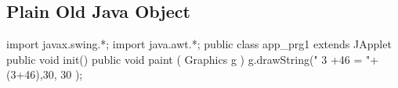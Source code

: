 \subsection{Plain Old Java Object}

\begin{pyglist}[caption={Imprimir.java}]
	import javax.swing.*;
	import java.awt.*;
	public class app_prg1 extends JApplet
	{ public void init(){}
		public void paint ( Graphics g ){
			g.drawString(" 3 +46 = "+(3+46),30, 30 );}
	}
\end{pyglist}
\section{}
\section{}